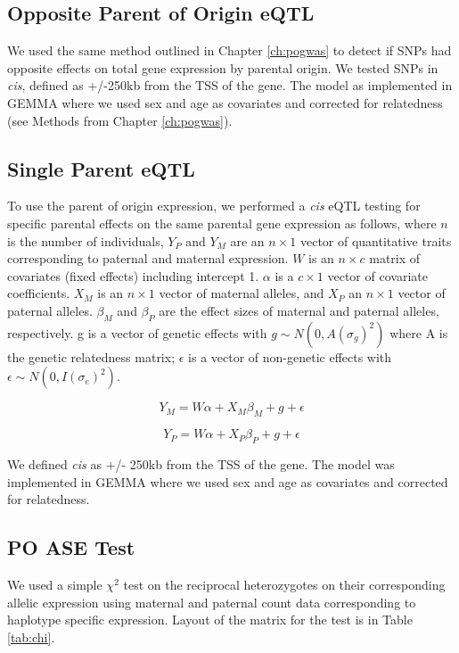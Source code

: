 \subsection{Opposite Parent of Origin eQTL}\label{Opposite Parent of Origin eQTL}
We used the same method outlined in Chapter \ref{ch:pogwas} to detect if SNPs had opposite effects on total gene expression by parental origin. We tested SNPs in \emph{cis}, defined as +/-250kb from the TSS of the gene. The model as implemented in GEMMA\cite{Zhou2012} where we used sex and age as covariates and corrected for relatedness (see Methods from Chapter  \ref{ch:pogwas}).

\subsection{Single Parent eQTL}\label{Single Parent eQTL}
To use the parent of origin expression, we performed a \emph{cis} eQTL testing for specific parental effects on the same parental gene expression as follows, where  $n$ is the number of individuals, $Y_{P}$ and $Y_{M}$ are an $n \times 1$ vector of quantitative traits corresponding to paternal and maternal expression. $W$ is an $n \times c$ matrix of covariates (fixed effects) including intercept 1. $\alpha$ is a $c \times 1$ vector of covariate coefficients. $X_M$  is an $n \times 1$ vector of maternal alleles, and $X_P$ an $n \times 1$ vector of paternal alleles. $\beta_M$ and $\beta_P$ are the effect sizes of maternal and paternal alleles, respectively. g is a vector of genetic effects with $g \sim N(0, A(\sigma_g)^2 )$ where A is the genetic relatedness matrix; $\epsilon$ is a vector of non-genetic effects with $\epsilon \sim N(0,I(\sigma_e)^2)$.

\begin{equation}
Y _{M}=W\alpha + X_{M}\beta_{M}+g+\epsilon
\end{equation}

\begin{equation}
Y _{P}=W\alpha + X_{P}\beta_{P}+g+\epsilon
\end{equation}

We defined \emph{cis} as +/- 250kb from the TSS of the gene. The model was implemented in GEMMA\cite{Zhou2012} where we used sex and age as covariates and corrected for relatedness.

\subsection{PO ASE Test}\label{PO ASE Test}
We used a simple $\chi^2$ test on the reciprocal heterozygotes on their corresponding allelic expression using maternal and paternal count data corresponding to haplotype specific expression. Layout of the matrix for the test is in Table \ref{tab:chi}.


